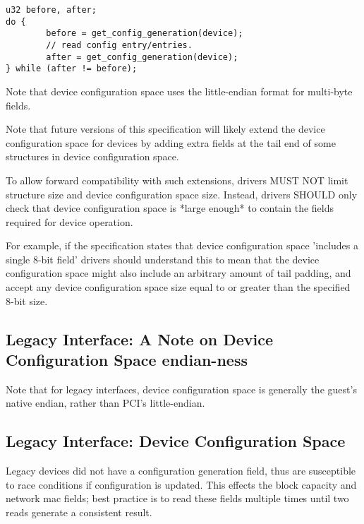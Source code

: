 \begin{lstlisting}
u32 before, after;
do {
        before = get_config_generation(device);
        // read config entry/entries.
        after = get_config_generation(device);
} while (after != before);
\end{lstlisting}

Note that device configuration space uses the little-endian format
for multi-byte fields.

Note that future versions of this specification will likely
extend the device configuration space for devices by adding extra fields
at the tail end of some structures in device configuration space.

To allow forward compatibility with such extensions, drivers MUST
NOT limit structure size and device configuration space size.  Instead,
drivers SHOULD only check that device configuration space is *large enough* to
contain the fields required for device operation.

For example, if the specification states that device configuration
space 'includes a single 8-bit field' drivers should understand this to mean that
the device configuration space might also include an arbitrary amount of
tail padding, and accept any device configuration space size equal to or
greater than the specified 8-bit size.

\subsection{Legacy Interface: A Note on Device Configuration Space endian-ness}\label{sec:Basic Facilities of a Virtio Device / Device Configuration Space / Legacy Interface: A Note on Configuration Space endian-ness}

Note that for legacy interfaces, device configuration space is generally the
guest's native endian, rather than PCI's little-endian.

\subsection{Legacy Interface: Device Configuration Space}\label{sec:Basic Facilities of a Virtio Device / Device Configuration Space / Legacy Interface: Device Configuration Space}

Legacy devices did not have a configuration generation field, thus are
susceptible to race conditions if configuration is updated.  This
effects the block capacity and network mac fields; best practice is to
read these fields multiple times until two reads generate a consistent
result.

